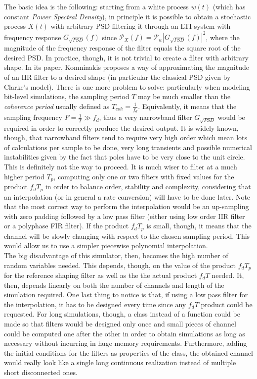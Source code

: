The basic idea is the following: starting from a white process $w(t)$ (which has constant \textit{Power Spectral Density}), in principle it is possible to obtain a stochastic process $X(t)$ with arbitrary PSD filtering it through an LTI system with frequency response $G_{\sqrt{PSD}}(f)$ since $\mathcal{P}_X(f) = \mathcal{P}_w |G_{\sqrt{PSD}}(f)|^2$, where the magnitude of the frequency response of the filter equals the square root of the desired PSD. In practice, though, it is not trivial to create a filter with arbitrary shape. In its paper, Komninakis proposes a way of approximating the magnitude of an IIR filter to a desired shape (in particular the classical PSD given by Clarke's model). There is one more problem to solve: particularly when modeling bit-level simulations, the sampling period $T$ may be much smaller than the \textit{coherence period} usually defined as $T_{coh}=\frac{1}{f_d}$. Equivalently, it means that the sampling frequency $F = \frac{1}{T} \gg f_d$, thus a very narrowband filter $G_{\sqrt{PSD}}$ would be required in order to correctly produce the desired output. It is widely known, though, that narrowband filters tend to require very high order which mean lots of calculations per sample to be done, very long transients and possible numerical instabilities given by the fact that poles have to be very close to the unit circle. This is definitely not the way to proceed. It is much wiser to filter at a much higher period $T_p$, computing only one or two filters with fixed values for the product $f_dT_p$ in order to balance order, stability and complexity, considering that an interpolation (or in general a rate conversion) will have to be done later. Note that the most correct way to perform the interpolation would be an up-sampling with zero padding followed by a low pass filter (either using low order IIR filter or a polyphase FIR filter). If the product $f_dT_p$ is small, though, it means that the channel will be slowly changing with respect to the chosen sampling period. This would allow us to use a simpler piecewise polynomial interpolation.\\
The big disadvantage of this simulator, then, becomes the high number of random variables needed. This depends, though, on the value of the product $f_dT_p$ for the reference shaping filter as well as the the actual product $f_dT$ needed. It, then, depends linearly on both the number of channels and length of the simulation required. One last thing to notice is that, if using a low pass filter for the interpolation, it has to be designed every time since any $f_dT$ product could be requested. For long simulations, though, a class instead of a function could be made so that filters would be designed only once and small pieces of channel could be computed one after the other in order to obtain simulations as long as necessary without incurring in huge memory requirements. Furthermore, adding the initial conditions for the filters as properties of the class, the obtained channel would really look like a single long continuous realization instead of multiple short disconnected ones.